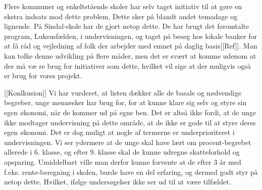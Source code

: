 Flere kommuner og enkeltstående skoler har selv taget initiativ til at gøre en ekstra indsats mod dette problem, Dette sker på blandt andet temadage og lignende. På Sindal-skole har de gjort netop dette. De har brugt det føromtalte program, Luksusfælden, i undervisningen, og taget på besøg hos lokale banker for at få råd og vejledning af folk der arbejder med emnet på daglig basis[[Ref]]. Man kan tolke denne udvikling på flere måder, men det er svært at komme udenom at der må væ
re brug for initiativer som dette, hvilket vil sige at der muligvis også er brug for vores projekt.



[[Konlkusion]]
Vi har vurderet, at listen dækker alle de basale og nødvendige begreber, unge mennesker har brug for, for at kunne klare sig selv og styre sin egen økonomi, når de kommer ud på egne ben. Det er altså ikke fordi, at de unge ikke modtager undervisning på dette område, at de ikke er gode til at styre deres egen økonomi. Det er dog muligt at nogle af termerne er underprioriteret i undervisningen. Vi ser ydermere at de unge skal have lært om procent-begrebet allerede i 6. klasse, og efter 9. klasse skal de kunne udregne skatteforhold og opsparing. Umiddelbart ville man derfor kunne forvente at de efter 3 år med f.eks. rente-beregning i skolen, burde have en del erfaring, og dermed godt styr på netop dette. Hvilket, ifølge undersøgelser ikke ser ud til at være tilfældet.